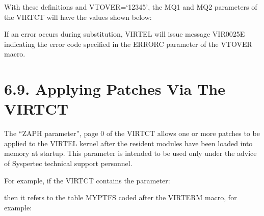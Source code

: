 \documentclass[letterpaper,10pt,english]{sphinxmanual}
\begin{document}
With these definitions and VTOVER=‘12345’, the MQ1 and MQ2 parameters of the VIRTCT will have the values shown below:

\begin{sphinxVerbatim}[commandchars=\\\{\}]
\end{sphinxVerbatim}

If an error occurs during substitution, VIRTEL will issue message VIR0025E indicating the error code specified in the ERRORC parameter of the VTOVER macro.


\section{6.9. Applying Patches Via The VIRTCT}
\label{\detokenize{Installation_Guide:applying-patches-via-the-virtct}}
The “ZAPH parameter”, page 0 of the VIRTCT allows one or more patches to be applied to the VIRTEL kernel after the resident modules have been loaded into memory at startup. This parameter is intended to be used only under the advice of Syspertec technical support personnel.

For example, if the VIRTCT contains the parameter:

\begin{sphinxVerbatim}[commandchars=\\\{\}]
 
\end{sphinxVerbatim}

then it refers to the table MYPTFS coded after the VIRTERM macro, for example:

\begin{sphinxVerbatim}[commandchars=\\\{\}]
   
  
   
\end{sphinxVerbatim}
\end{document}
